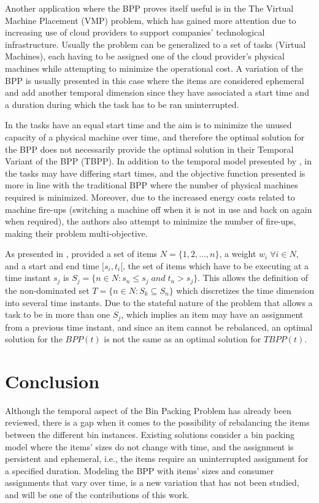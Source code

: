 Another application where the BPP proves itself useful is in the The Virtual
Machine Placement (VMP) problem, which has gained more attention due to
increasing use of cloud providers to support companies' technological
infrastructure. Usually the problem can be generalized to a set of tasks
(Virtual Machines), each having to be assigned one of the cloud provider's
physical machines while attempting to minimize the operational cost. A variation
of the BPP is usually presented in this case where the items are considered
ephemeral and add another temporal dimension since they have associated a start
time and a duration during which the task has to be ran uninterrupted. 

In \cite{de2016temporal} the tasks have an equal start time and the aim is to
minimize the unused capacity of a physical machine over time, and therefore the
optimal solution for the BPP does not necessarily provide the optimal solution
in their Temporal Variant of the BPP (TBPP). In addition to the temporal model
presented by \cite{de2016temporal}, in \cite{aydin2020multi} the tasks may have
differing start times, and the objective function presented is more in line with
the traditional BPP where the number of physical machines required is minimized.
Moreover, due to the increased energy costs related to machine fire-ups
(switching a machine off when it is not in use and back on again when required),
the authors also attempt to minimize the number of fire-ups, making their
problem multi-objective.

As presented in \cite{furini2018matheuristics}, provided a set of items $N =
\{1,2,...,n\}$, a weight $w_i \; \forall i \in N$, and a start and end time
$[s_i, t_i[$, the set of items which have to be executing at a time instant
$s_j$ is $S_j = \{n \in N: s_n \leq s_j \; and \; t_n > s_j\}$. This allows the
definition of the non-dominated set $T = \{n \in N: S_k \subseteq S_n\}$ which
discretizes the time dimension into several time instants. Due to the stateful
nature of the problem that allows a task to be in more than one $S_j$, which
implies an item may have an assignment from a previous time instant, and since
an item cannot be rebalanced, an optimal solution for the $BPP(t)$ is not the
same as an optimal solution for $TBPP(t)$.

\section{Conclusion}

Although the temporal aspect of the Bin Packing Problem has already been
reviewed, there is a gap when it comes to the possibility of rebalancing the
items between the different bin instances. Existing solutions consider a bin
packing model where the items' sizes do not change with time, and the assignment
is persistent and ephemeral, i.e., the items require an uninterrupted assignment
for a specified duration. Modeling the BPP with items' sizes and consumer
assignments that vary over time, is a new variation that has not been studied,
and will be one of the contributions of this work. 

